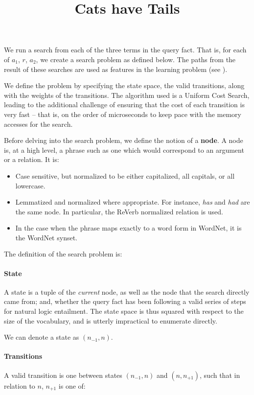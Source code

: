 \documentclass[11pt,a4paper]{article}
\title{Cats have Tails}
\author{ 
}
\date{}
\def\w#1{\textit{#1}}
\begin{document}
\maketitle


We run a search from each of the three terms in the
  query fact.
That is, for each of $a_1$, $r$, $a_2$, we create a
  search problem as defined below.
The paths from the result of these searches are used
  as features in the learning problem
  (see ).

We define the problem by specifying the state space,
  the valid transitions, along with the weights of
  the transitions.
The algorithm used is a Uniform Cost Search, leading
  to the additional challenge of ensuring that the
  cost of each transition is very fast -- that is,
  on the order of microseconds to keep pace with
  the memory accesses for the search.

Before delving into the search problem, we define the
  notion of a \textbf{node}.
A node is, at a high level, a phrase such as one
  which would correspond to an argument or a relation.
It is:
\begin{itemize}
\item Case sensitive, but normalized to be either
      capitalized, all capitals, or all lowercase.
\item Lemmatized and normalized where appropriate.
      For instance, \w{has} and \w{had} are the same
      node. In particular, the ReVerb normalized
      relation is used.
\item In the case when the phrase maps exactly to a
      word form in WordNet, it is the WordNet synset.
\end{itemize}

The definition of the search problem is:

\paragraph{State}
A state is a tuple of the \textit{current} 
  node, as well as the node that the search
  directly came from; and, whether the query fact has been
  following a valid series of steps for natural logic entailment.
The state space is thus squared with respect to the
  size of the vocabulary, and is utterly impractical
  to enumerate directly.

We can denote a state as $(n_{-1}, n)$.

\paragraph{Transitions}
A valid transition is one between states
  $(n_{-1}, n)$ and $(n, n_{+1})$, such that in
  relation to $n$, $n_{+1}$ is one of:
\end{document}
